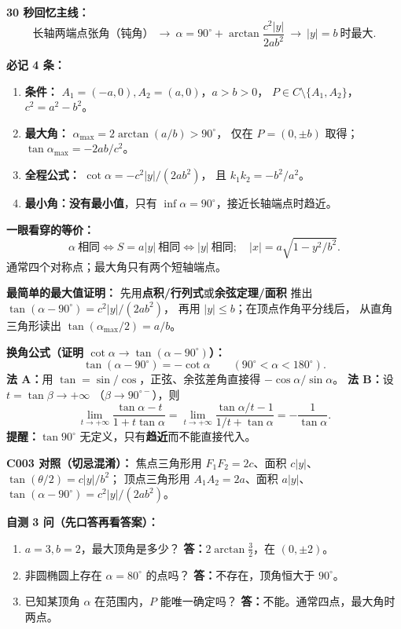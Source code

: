 \begin{summarybox}
\textbf{30 秒回忆主线：}
\[
\boxed{\text{长轴两端点张角（钝角）}}
\ \longrightarrow\ 
\boxed{\alpha=90^\circ+\arctan\frac{c^2|y|}{2ab^2}}
\ \longrightarrow\ 
\boxed{|y|=b\ \text{时最大}}.
\]

\textbf{必记 4 条：}
\begin{enumerate}
\item \textbf{条件：} $A_1=(-a,0),A_2=(a,0)$，$a>b>0$，
$P\in C\setminus\{A_1,A_2\}$，$c^2=a^2-b^2$。
\item \textbf{最大角：}
$\displaystyle\boxed{\alpha_{\max}=2\arctan(a/b)>90^\circ}$，
仅在 $P=(0,\pm b)$ 取得；
$\displaystyle\boxed{\tan\alpha_{\max}=-2ab/c^2}$。
\item \textbf{全程公式：}
$\displaystyle\boxed{\cot\alpha=-c^2|y|/(2ab^2)}$，
且 $\displaystyle\boxed{k_1k_2=-b^2/a^2}$。
\item \textbf{最小角：}\textbf{没有最小值}，只有
$\displaystyle\boxed{\inf\alpha=90^\circ}$，接近长轴端点时趋近。
\end{enumerate}

\textbf{一眼看穿的等价：}
\[
\boxed{\alpha\ \text{相同}}
\iff\boxed{S=a|y|\ \text{相同}}
\iff\boxed{|y|\ \text{相同}};
\quad
|x|=a\sqrt{1-y^2/b^2}.
\]
通常四个对称点；最大角只有两个短轴端点。

\textbf{最简单的最大值证明：}
先用\textbf{点积/行列式}或\textbf{余弦定理/面积}
推出 $\tan(\alpha-90^\circ)=c^2|y|/(2ab^2)$，
再用 $|y|\le b$；在顶点作角平分线后，
从直角三角形读出 $\tan(\alpha_{\max}/2)=a/b$。

\textbf{换角公式（证明 $\cot\alpha\to\tan(\alpha-90^\circ)$）：}
\[
\boxed{\tan(\alpha-90^\circ)=-\cot\alpha}
\qquad (90^\circ<\alpha<180^\circ).
\]
\textbf{法 A：}用 $\tan=\sin/\cos$，正弦、余弦差角直接得
$-\cos\alpha/\sin\alpha$。
\textbf{法 B：}设 $t=\tan\beta\to+\infty$
（$\beta\to90^{\circ-}$），则
\[
\lim_{t\to+\infty}\frac{\tan\alpha-t}{1+t\tan\alpha}
=\lim_{t\to+\infty}\frac{\tan\alpha/t-1}{1/t+\tan\alpha}
=-\frac1{\tan\alpha}.
\]
\textbf{提醒：}$\tan90^\circ$ 无定义，只有\textbf{趋近}而不能直接代入。

\textbf{C003 对照（切忌混淆）：}
焦点三角形用 $F_1F_2=2c$、面积 $c|y|$、
$\tan(\theta/2)=c|y|/b^2$；
顶点三角形用 $A_1A_2=2a$、面积 $a|y|$、
$\tan(\alpha-90^\circ)=c^2|y|/(2ab^2)$。

\medskip
\textbf{自测 3 问（先口答再看答案）：}
\begin{enumerate}
\item $a=3,b=2$，最大顶角是多少？
\quad \textbf{答：}$\displaystyle2\arctan\frac32$，在 $(0,\pm2)$。
\item 非圆椭圆上存在 $\alpha=80^\circ$ 的点吗？
\quad \textbf{答：}不存在，顶角恒大于 $90^\circ$。
\item 已知某顶角 $\alpha$ 在范围内，$P$ 能唯一确定吗？
\quad \textbf{答：}不能。通常四点，最大角时两点。
\end{enumerate}
\end{summarybox}
